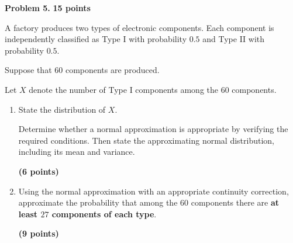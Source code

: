 \documentclass[11pt]{article}
\begin{document}
\newpage



\begin{problemheader}
\textbf{Problem 5.} \hfill \textbf{15 points}
\end{problemheader}

A factory produces two types of electronic components. Each component is
independently classified as Type I with probability \(0.5\) and Type II
with probability \(0.5\).

Suppose that \(60\) components are produced.

Let \(X\) denote the number of Type I components among the \(60\)
components.

\begin{enumerate}[label=(\alph*),leftmargin=*,itemsep=0.9em]

    \item State the distribution of \(X\).

    Determine whether a normal approximation is appropriate by verifying
    the required conditions. Then state the approximating normal
    distribution, including its mean and variance.

    \hfill \textbf{(6 points)}

    \item Using the normal approximation with an appropriate continuity
    correction, approximate the probability that among the \(60\)
    components there are \textbf{at least \(27\) components of each type}.

    \hfill \textbf{(9 points)}

\end{enumerate}
\end{document}
